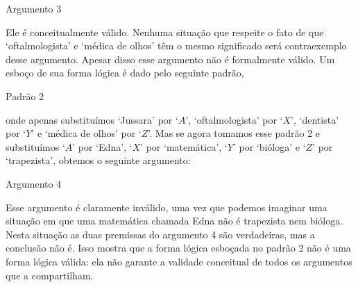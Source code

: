 \begin{description}
\item[Argumento 3]
\end{description}
Ele é conceitualmente válido.
Nenhuma situação que respeite o fato de que `oftalmologista' e `médica de olhos' têm o mesmo significado será contraexemplo desse argumento.
Apesar disso esse argumento não é formalmente válido.
Um esboço de sua forma lógica é dado pelo seguinte padrão,
\begin{description}
\item[Padrão 2]
\end{description}
 onde apenas substituímos `Jussara' por `$A$',  `oftalmologista' por `$X$', `dentista' por `$Y$' e  `médica de olhos' por `$Z$'.
 Mas se agora tomamos esse padrão 2 e substituímos `$A$' por `Edna', `$X$' por `matemática', `$Y$' por `bióloga' e `$Z$' por `trapezista', obtemos o seguinte argumento:
\begin{description}
\item[Argumento 4]
\end{description}
Esse argumento é claramente inválido, uma vez que podemos imaginar uma situação em que uma matemática chamada Edna  não é  trapezista nem  bióloga.
Nesta situação as duas premissas do argumento 4 são verdadeiras, mas a conclusão não é.
Isso mostra que a forma lógica esboçada no padrão 2 não é uma forma lógica válida:
ela não garante a validade conceitual de todos os argumentos que a compartilham.

